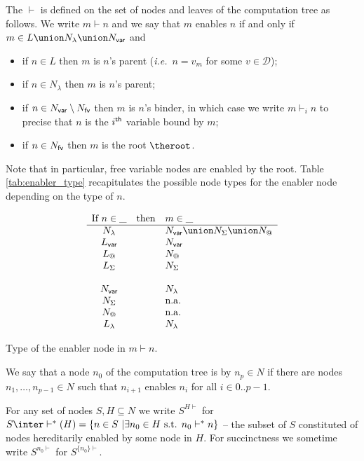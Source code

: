 \begin{definition}[Enabling]
The  $\vdash$ is defined on the set of
nodes and leaves of the computation tree as follows. We write $m \vdash n$ and
we say that $m$ enables $n$ if and only if
$m \in L \union N_\lambda \union N_{\sf var}$ and
\begin{itemize}
\item if $n \in L$ then $m$ is $n$'s parent ({\it i.e.}\ $n=v_m$ for some $v\in\mathcal{D}$);
\item if $n\in N_\lambda$ then $m$ is $n$'s parent;
\item if $n \in N_{\sf var} \setminus N_{\sf fv}$ then
        $m$ is $n$'s binder, in which case we write $m \vdash_i n$ to precise that $n$ is the $i^{\sf th}$ variable bound by $m$;
\item if $n \in N_{\sf fv}$ then $m$ is the root $\theroot$.
\end{itemize}
Note that in particular, free variable nodes are enabled by the root.
Table \ref{tab:enabler_type} recapitulates the possible node types for the enabler node depending on the type of $n$.
\end{definition}


\begin{table}[htbp]
$$
\begin{array}{ccl}
\mbox{If } n\in \_  & \mbox{then} & m\in \_ \\ \hline
N_\lambda & & N_{\sf var} \union N_\Sigma \union N_@ \\
L_{\sf var} & & N_{\sf var} \\
L_@ & &  N_@ \\
L_\Sigma & & N_\Sigma\\
\\
N_{\sf var} & & N_\lambda\\
N_\Sigma & & \mbox{n.a.} \\
N_@ & & \mbox{n.a.} \\
L_\lambda & & N_\lambda\\
\end{array}
$$
\caption[Type of the justifying node]{Type of the enabler node in $m\vdash n$.}
\label{tab:enabler_type}
\end{table}

We say that a node $n_0$ of the computation tree is  by $n_p \in N$ if there are nodes $n_1,\ldots, n_{p-1} \in N$ such that $n_{i+1}$ enables $n_{i}$
for all $i\in 0..p-1$.

For any set of nodes $S, H \subseteq N$ we write $S^{H\vdash}$ for $S \inter \vdash^*(H) = \{ n \in S \ | \exists n_0 \in H \mbox{ s.t. }n_0  \vdash^* n \}$ -- the subset of $S$ constituted of nodes hereditarily enabled by some node in $H$. For succinctness we sometime write $S^{n_0\vdash}$ for
$S^{\{n_0\}\vdash}$.

